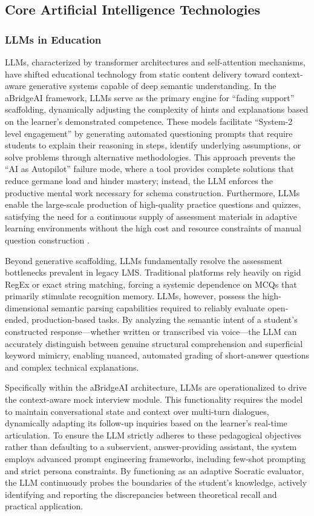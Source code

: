 \subsection{Core Artificial Intelligence Technologies}
\subsubsection{LLMs in Education}
LLMs, characterized by transformer architectures and self-attention mechanisms, have shifted educational technology from static content delivery toward context-aware generative systems capable of deep semantic understanding. In the aBridgeAI framework, LLMs serve as the primary engine for ``fading support'' scaffolding, dynamically adjusting the complexity of hints and explanations based on the learner's demonstrated competence. These models facilitate ``System-2 level engagement'' by generating automated questioning prompts that require students to explain their reasoning in steps, identify underlying assumptions, or solve problems through alternative methodologies. This approach prevents the ``AI as Autopilot'' failure mode, where a tool provides complete solutions that reduce germane load and hinder mastery; instead, the LLM enforces the productive mental work necessary for schema construction. Furthermore, LLMs enable the large-scale production of high-quality practice questions and quizzes, satisfying the need for a continuous supply of assessment materials in adaptive learning environments without the high cost and resource constraints of manual question construction \cite{kasneci2023chatgpt}.

Beyond generative scaffolding, LLMs fundamentally resolve the assessment bottlenecks prevalent in legacy LMS. Traditional platforms rely heavily on rigid RegEx or exact string matching, forcing a systemic dependence on MCQs that primarily stimulate recognition memory. LLMs, however, possess the high-dimensional semantic parsing capabilities required to reliably evaluate open-ended, production-based tasks. By analyzing the semantic intent of a student's constructed response---whether written or transcribed via voice---the LLM can accurately distinguish between genuine structural comprehension and superficial keyword mimicry, enabling nuanced, automated grading of short-answer questions and complex technical explanations.

Specifically within the aBridgeAI architecture, LLMs are operationalized to drive the context-aware mock interview module. This functionality requires the model to maintain conversational state and context over multi-turn dialogues, dynamically adapting its follow-up inquiries based on the learner's real-time articulation. To ensure the LLM strictly adheres to these pedagogical objectives rather than defaulting to a subservient, answer-providing assistant, the system employs advanced prompt engineering frameworks, including few-shot prompting and strict persona constraints. By functioning as an adaptive Socratic evaluator, the LLM continuously probes the boundaries of the student's knowledge, actively identifying and reporting the discrepancies between theoretical recall and practical application.

